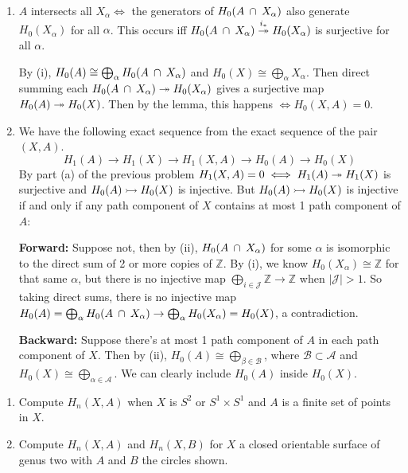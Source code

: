 \documentclass[twoside,10pt]{article}
\begin{document}
\begin{enumerate}
		\item $A$ intersects all $X_{\alpha} \iff$ the generators of $H_0(A \operatorname{\;\cap\;} X_{\alpha})$ also generate $H_{0}(X_{\alpha})$ for all $\alpha$. This occurs iff $H_0(A \operatorname{\;\cap\;} X_{\alpha}) \stackrel{i_{*}}{\twoheadrightarrow} H_0(X_{\alpha})$ is surjective for all $\alpha$.

		By (i), $H_0(A) \cong \bigoplus_{\alpha}H_0(A \operatorname{\;\cap\;} X_{\alpha})$ and $H_0(X) \cong \bigoplus_{\alpha}X_{\alpha}$. Then direct summing each $H_0(A \operatorname{\;\cap\;} X_{\alpha}) \twoheadrightarrow H_0(X_{\alpha})$ gives a surjective map $H_0(A) \twoheadrightarrow H_0(X)$. Then by the lemma, this happens $\iff H_0(X,A) = 0$.

		\item We have the following exact sequence from the exact sequence of the pair $(X,A)$.
			\[
				H_1(A) \to H_1(X) \to H_1(X,A) \to  H_0(A) \to H_0(X)
			\] By part (a) of the previous problem $H_1(X,A) = 0 \iff H_1(A) \twoheadrightarrow H_1(X)$ is surjective and $H_0(A) \rightarrowtail H_0(X)$ is injective. But $H_0(A) \rightarrowtail H_0(X)$ is injective if and only if any path component of $X$ contains at most 1 path component of $A$:

\textbf{Forward:} Suppose not, then by (ii), $H_0(A \operatorname{\;\cap\;} X_{\alpha})$ for some $\alpha$ is isomorphic to the direct sum of 2 or more copies of $\mathbb{Z}$. By (i), we know $H_0(X_{\alpha})\cong \mathbb{Z}$ for that same $\alpha$, but there is no injective map $\bigoplus_{i \in \mathcal{J}}\mathbb{Z} \to \mathbb{Z}$ when $|\mathcal{J}|>1$. So taking direct sums, there is no injective map $H_0(A) = \bigoplus_{\alpha}H_0(A \operatorname{\;\cap\;} X_{\alpha}) \to \bigoplus_{\alpha} H_0(X_{\alpha}) = H_0(X)$, a contradiction.

\textbf{Backward:} Suppose there's at most 1 path component of $A$ in each path component of $X$. Then by (ii), $H_0(A) \cong \bigoplus_{\beta \in \mathcal{B}}$, where $\mathcal{B} \subset \mathcal{A}$ and $H_0(X) \cong \bigoplus_{\alpha \in \mathcal{A}}$. We can clearly include $H_0(A)$ inside $H_0(X)$.
\end{enumerate}

\newpage

\begin{exer}[2.1: 17]
\begin{enumerate}
	\item Compute $H_{n}(X,A)$ when $X$ is $S^2$ or $S^1\times S^{1}$ and $A$ is a finite set of points in $X$.
	\item Compute $H_{n}(X,A)$ and $H_{n}(X,B)$ for $X$ a closed orientable surface of genus two with $A$ and $B$ the circles shown.
\end{enumerate}
\end{exer}
\end{document}
